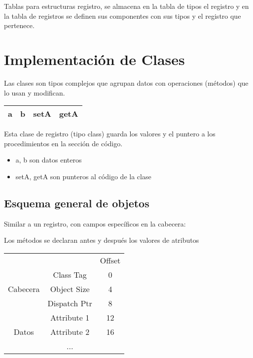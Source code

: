 \documentclass[12pt, twoside, openright]{report} %
\begin{document}
Tablas para estructuras registro, se almacena en la tabla de tipos el registro y en la tabla de registros se definen sus componentes con sus tipos y el registro que pertenece.
\begin{figure}[H]
	{\def\svgwidth{.9\textwidth}
		}
\end{figure}

\section{Implementación de Clases}
Las clases son tipos complejos que agrupan datos con operaciones (métodos) que lo usan y modifican.

\begin{table}[h]
	\begin{tabular}{|c|c|c|c|}
		\hline
		a & b & setA & getA \\ \hline
	\end{tabular}
\end{table}

Esta clase de registro (tipo class) guarda los valores y el puntero a los procedimientos en la sección de código.
\begin{itemize}
	\item a,  b son datos enteros
	\item setA, getA son punteros al código de la clase
\end{itemize}

\subsection{Esquema general de objetos}
Similar a un registro, con campos específicos en la cabecera:

Los métodos se declaran antes y después los valores de atributos

\begin{table}[h]
	\begin{tabular}{ccc}
		                                               &                                   & Offset \\ \cline{2-2}
		\multicolumn{1}{c|}{\multirow{3}{*}{Cabecera}} & \multicolumn{1}{c|}{Class Tag}    & 0      \\ \cline{2-2}
		\multicolumn{1}{c|}{}                          & \multicolumn{1}{c|}{Object Size}  & 4      \\ \cline{2-2}
		\multicolumn{1}{c|}{}                          & \multicolumn{1}{c|}{Dispatch Ptr} & 8      \\ \cline{2-2}
		\multicolumn{1}{c|}{\multirow{3}{*}{Datos}}    & \multicolumn{1}{c|}{Attribute 1}  & 12     \\ \cline{2-2}
		\multicolumn{1}{c|}{}                          & \multicolumn{1}{c|}{Attribute 2}  & 16     \\ \cline{2-2}
		\multicolumn{1}{c|}{}                          & \multicolumn{1}{c|}{...}          &        \\ \cline{2-2}
	\end{tabular}
\end{table}
\end{document}
